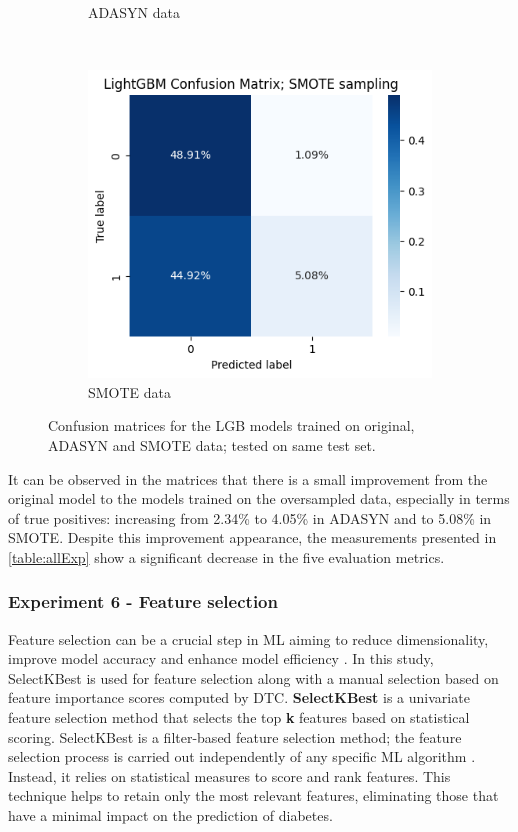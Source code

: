 \documentclass[runningheads]{llncs}
\begin{document}
\begin{figure}[htbp]
\begin{subfigure}[t]{0.3\textwidth}
        \caption{ADASYN data}
        \label{Fig:exp2_matrix_adasyn}
    \end{subfigure}
    ~ 
    \begin{subfigure}[t]{0.3\textwidth}
        \centering
        \includegraphics[width=0.99\linewidth]{images/exp2_matrix_smote.png}
        \caption{SMOTE data}
        \label{Fig:exp2_matrix_smote}
    \end{subfigure}
    \caption{Confusion matrices for the LGB models trained on original, ADASYN and SMOTE data; tested on same test set.}
    \label{fig:exp2_matrices}
\end{figure}


It can be observed in the matrices that there is a small improvement from the original model to the models trained on the oversampled data, especially in terms of true positives: increasing from 2.34\% to 4.05\%  in ADASYN and to 5.08\% in SMOTE. Despite this improvement appearance, the measurements presented in \autoref{table:allExp} show a significant decrease in the five evaluation metrics.


\subsubsection{Experiment 6 - Feature selection}

Feature selection can be a crucial step in ML aiming to reduce dimensionality, improve model accuracy and enhance model efficiency \cite{BARBIERI2024123667}. In this study, SelectKBest is used for feature selection along with a manual selection based on feature importance scores computed by DTC. \textbf {SelectKBest} is a univariate feature selection method that selects the top \textbf{k} features based on statistical scoring.  SelectKBest is a filter-based feature selection method; the feature selection process is carried out independently of any specific ML algorithm \cite{selectkbest}. Instead, it relies on statistical measures to score and rank features.
This technique helps to retain only the most relevant features, eliminating those that have a minimal impact on the prediction of diabetes. 
\end{document}
